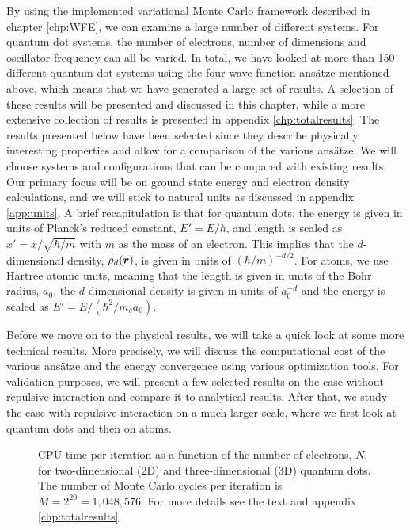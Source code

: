By using the implemented variational Monte Carlo framework described in chapter \ref{chp:WFE}, we can examine a large number of different systems. For quantum dot systems, the number of electrons, number of dimensions and oscillator frequency can all be varied. In total, we have looked at more than 150 different quantum dot systems using the four wave function ansätze mentioned above, which means that we have generated a large set of results. A selection of these results will be presented and discussed in this chapter, while a more extensive collection of results is presented in appendix \ref{chp:totalresults}. The results presented below have been selected since they describe physically interesting properties and allow for a comparison of the various ansätze. We will choose systems and configurations that can be compared with existing results. Our primary focus will be on ground state energy and electron density calculations, and we will stick to natural units as discussed in appendix \ref{app:units}. A brief recapitulation is that for quantum dots, the energy is given in units of Planck's reduced constant, $E'=E/\hbar$, and length is scaled as $x'=x/\sqrt{\hbar/m}$ with $m$ as the mass of an electron. This implies that the $d$-dimensional density, $\rho_d(\boldsymbol{{r}})$, is given in units of $(\hbar/m)^{-d/2}$. For atoms, we use Hartree atomic units, meaning that the length is given in units of the Bohr radius, $a_0$, the $d$-dimensional density is given in units of $a_0^{-d}$ and the energy is scaled as $E'=E/(\hbar^2/m_ea_0)$.

Before we move on to the physical results, we will take a quick look at some more technical results. More precisely, we will discuss the computational cost of the various ansätze and the energy convergence using various optimization tools. For validation purposes, we will present a few selected results on the case without repulsive interaction and compare it to analytical results. After that, we study the case with repulsive interaction on a much larger scale, where we first look at quantum dots and then on atoms. 

\begin{figure}
	\centering 
	
	\caption{CPU-time per iteration as a function of the number of electrons, $N$, for two-dimensional (2D) and three-dimensional (3D) quantum dots. The number of Monte Carlo cycles per iteration is $M=2^{20}=1,048,576$. For more details see the text and appendix \ref{chp:totalresults}.}
	\label{fig:cpu_time}
\end{figure} 

